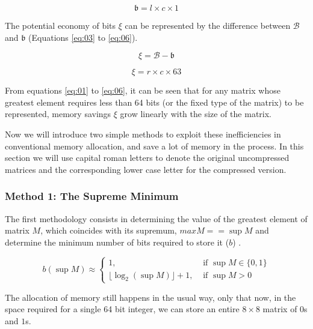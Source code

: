 \documentclass[10pt]{article}
\begin{document}
\begin{equation}\label{eq:02}
  \mathfrak{b} = l \times c \times 1
\end{equation}

The potential economy of bits $\xi$ can be represented by the difference between $\mathcal{B}$ and $\mathfrak{b}$ (Equations \ref{eq:03} to \ref{eq:06}).

\begin{equation}\label{eq:03}
 \xi = \mathcal{B} - \mathfrak{b}
\end{equation}

\begin{equation} \label{eq:06}
 \xi =  r \times c \times 63
\end{equation}

From equations \ref{eq:01} to \ref{eq:06}, it can be seen that for any matrix whose greatest element requires less than 64 bits (or the fixed type of the matrix) to be represented, memory savings $\xi$ grow linearly with the size of the matrix.

Now we will introduce two simple methods to exploit these inefficiencies in conventional memory allocation, and save a lot of memory in the process. In this section we will use capital roman letters to denote the original uncompressed matrices and the corresponding lower case letter for the compressed version.

\subsubsection*{Method 1: The Supreme Minimum}

The first methodology consists in determining the value of the greatest element of matrix $M$, which coincides with its supremum, $max M == \sup M$  and determine the minimum number of bits required to store it ($b$) .

\begin{equation} \label{eq:07}
 b(\sup M) \approx \begin{cases}
	1, &  \text{ if } \sup M \in \{0,1\} \\ 
	\lfloor \log_2(\sup M)  \rfloor + 1,  & \text{ if } \sup M > 0  
	\end{cases}
\end{equation}

The allocation of memory still happens in the usual way, only that now, in the space required for a single 64 bit integer, we can store an entire $8\times 8$ matrix of $0$s and $1$s. 
\end{document}
